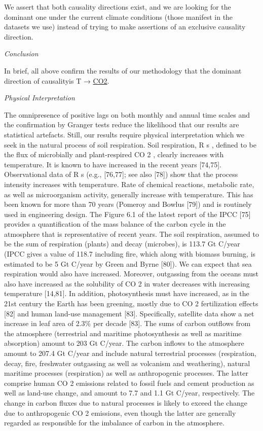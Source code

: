 \documentclass[
]{book}
\begin{document}
We assert that both causality directions exist, and we are looking for
the dominant one under the current climate conditions (those manifest in the datasets we use)
instead of trying to make assertions of an exclusive causality direction.

\emph{Conclusion}

In brief, all above confirm the results of our methodology that the dominant direction of causalityis T → \protect\hyperlink{co2}{CO2}.

\emph{Physical Interpretation}

The omnipresence of positive lags on both monthly and annual time scales and the confirmation
by Granger tests reduce the likelihood that our results are statistical artefacts. Still, our results require
physical interpretation which we seek in the natural process of soil respiration.
Soil respiration, R s , defined to be the flux of microbially and plant-respired CO 2 , clearly increases
with temperature. It is known to have increased in the recent years {[}74,75{]}. Observational data of R s
(e.g., {[}76,77{]}; see also {[}78{]}) show that the process intensity increases with temperature. Rate of chemical
reactions, metabolic rate, as well as microorganism activity, generally increase with temperature.
This has been known for more than 70 years (Pomeroy and Bowlus {[}79{]}) and is routinely used in
engineering design.
The Figure 6.1 of the latest report of the IPCC {[}75{]} provides a quantification of the mass balance
of the carbon cycle in the atmosphere that is representative of recent years. The soil respiration,
assumed to be the sum of respiration (plants) and decay (microbes), is 113.7 Gt C/year (IPCC gives
a value of 118.7 including fire, which along with biomass burning, is estimated to be 5 Gt C/year by
Green and Byrne {[}80{]}).
We can expect that sea respiration would also have increased. Moreover, outgassing from
the oceans must also have increased as the solubility of CO 2 in water decreases with increasing
temperature {[}14,81{]}. In addition, photosynthesis must have increased, as in the 21st century the Earth
has been greening, mostly due to CO 2 fertilization effects {[}82{]} and human land-use management {[}83{]}.
Specifically, satellite data show a net increase in leaf area of 2.3\% per decade {[}83{]}. The sums of carbon
outflows from the atmosphere (terrestrial and maritime photosynthesis as well as maritime absorption)
amount to 203 Gt C/year. The carbon inflows to the atmosphere amount to 207.4 Gt C/year and include
natural terrestrial processes (respiration, decay, fire, freshwater outgassing as well as volcanism and
weathering), natural maritime processes (respiration) as well as anthropogenic processes. The latter
comprise human CO 2 emissions related to fossil fuels and cement production as well as land-use
change, and amount to 7.7 and 1.1 Gt C/year, respectively. The change in carbon fluxes due to natural
processes is likely to exceed the change due to anthropogenic CO 2 emissions, even though the latter
are generally regarded as responsible for the imbalance of carbon in the atmosphere.
\end{document}
